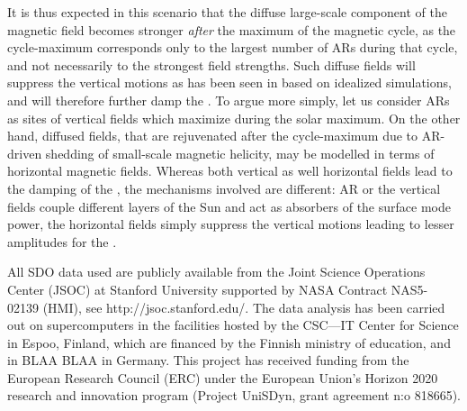 \documentclass{aa}
\begin{document}
It is thus expected in this scenario that the diffuse large-scale component of the magnetic field
becomes stronger \emph{after} the maximum of the magnetic cycle, as the cycle-maximum corresponds
only to the largest number of ARs during that cycle, and not necessarily to the strongest field
strengths. Such diffuse fields will suppress the vertical motions as has been seen in \citet{S+15}
based on idealized simulations, and will therefore further damp the \fff.
To argue more simply, let us consider ARs as sites of vertical fields which maximize during the
solar maximum. On the other hand, diffused fields, that are rejuvenated after the cycle-maximum due
to AR-driven shedding of small-scale magnetic helicity, may be modelled in terms of horizontal
magnetic fields. Whereas both vertical as well horizontal fields lead to the damping of the
\fff, the mechanisms involved are different: AR or the vertical fields couple different layers
of the Sun and act as absorbers of the surface mode power, the horizontal fields simply suppress the
vertical motions leading to lesser amplitudes for the \fff.

\begin{acknowledgements}
All SDO data used are publicly available from the Joint Science Operations Center (JSOC) at Stanford University supported by NASA Contract NAS5- 02139 (HMI), see http://jsoc.stanford.edu/. 
The data analysis has been carried out on supercomputers in the facilities hosted by the CSC---IT
Center for Science in Espoo, Finland, which are financed by the
Finnish ministry of education, and in BLAA BLAA in Germany.
This project has received funding from the European Research Council (ERC)
under the European Union's Horizon 2020 research and innovation
program (Project UniSDyn, grant agreement n:o 818665).

\end{acknowledgements}

{}

\end{document}
